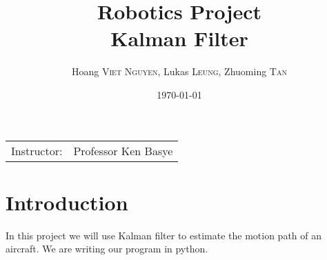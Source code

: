 \documentclass[12pt]{article}
\title{Robotics Project \\ Kalman Filter} %
\author{Hoang \textsc{Viet Nguyen}, Lukas \textsc{Leung}, Zhuoming \textsc{Tan}} %
\date{\today} %
\begin{document}
	\maketitle %

	\begin{center}
		\begin{tabular}{l r}
			Instructor: & Professor Ken Basye \\ %
		\end{tabular}
	\end{center}





	\section{Introduction}\label{sec:intro}

	In this project we will use Kalman filter to estimate the motion path of an aircraft. We are writing our program in python.
\end{document}
